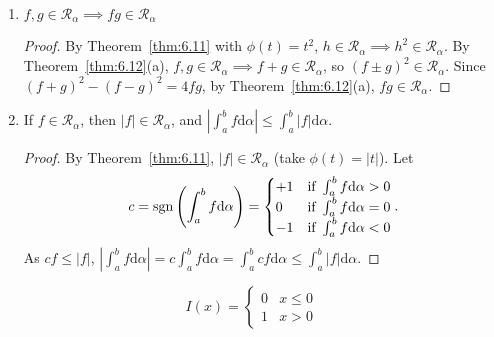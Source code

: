 \begin{thm}[13]
	\begin{enumerate}
		\item $f,g \in \mathscr{R}_{\alpha}\implies fg \in \mathscr{R}_{\alpha}$
		      \begin{proof}
			      By Theorem~\ref{thm:6.11} with $\phi(t)=t^2$, $h \in \mathscr{R}_{\alpha}\implies h^2 \in \mathscr{R}_{\alpha}$.
			      By Theorem~\ref{thm:6.12}(a), $f,g \in \mathscr{R}_{\alpha}\implies f+g \in \mathscr{R}_{\alpha}$, so $(f\pm g)^2 \in \mathscr{R}_{\alpha}$.
			      Since $(f+g)^2-(f-g)^2=4fg$, by Theorem~\ref{thm:6.12}(a), $fg \in \mathscr{R}_{\alpha}$.
		      \end{proof}
		\item If $f \in \mathscr{R}_{\alpha}$, then $|f| \in \mathscr{R}_{\alpha}$, and $\left|\int_{a}^{b}{f\mathrm{d}\alpha}\right|\le \int_{a}^{b}{|f|\mathrm{d}\alpha}$.
		      \begin{proof}
			      By Theorem~\ref{thm:6.11}, $|f| \in \mathscr{R}_{\alpha}$ (take $\phi(t)=|t|$).
			      Let \[
				      c=\operatorname{sgn}\left( \int_{a}^{b}{f\mathrm{d}\alpha}\right)=
				      \begin{cases}
					      +1 & \text{if } \int_{a}^{b}{f\mathrm{d}\alpha}>0 \\
					      0  & \text{if } \int_{a}^{b}{f\mathrm{d}\alpha}=0 \\
					      -1 & \text{if } \int_{a}^{b}{f\mathrm{d}\alpha}<0
				      \end{cases}
				      .\]
			      As $cf\le |f|$,
			      $\left|   \int_{a}^{b}{f\mathrm{d}\alpha}\right|=c\int_{a}^{b}{f\mathrm{d}\alpha}=\int_{a}^{b}{cf\mathrm{d}\alpha}\le \int_{a}^{b}{|f|\mathrm{d}\alpha}$.
		      \end{proof}
	\end{enumerate}

\end{thm}

\begin{define}
	\label{def:unit_step}
	\[
		I(x)=\begin{cases}
			0 & x\le 0 \\
			1 & x>0
		\end{cases}
	\]
\end{define}

